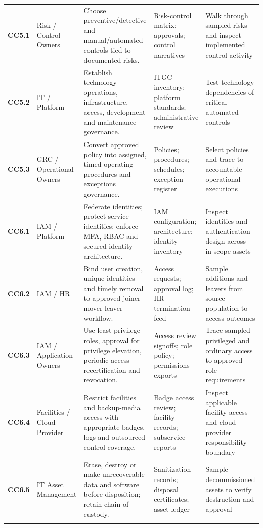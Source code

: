 \documentclass[10pt,oneside]{report}
\begin{document}
\begin{landscape}
\begin{longtable}{@{}>{\raggedright\arraybackslash}p{0.6in}>{\raggedright\arraybackslash}p{1.0in}>{\raggedright\arraybackslash}p{2.5in}>{\raggedright\arraybackslash}p{2.35in}>{\raggedright\arraybackslash}p{2.20in}@{}}
\textbf{CC5.1} & Risk / Control Owners & Choose preventive/detective and manual/automated controls tied to documented risks. & Risk-control matrix; approvals; control narratives & Walk through sampled risks and inspect implemented control activity \\
\addlinespace[5pt]
\textbf{CC5.2} & IT / Platform & Establish technology operations, infrastructure, access, development and maintenance governance. & ITGC inventory; platform standards; administrative review & Test technology dependencies of critical automated controls \\
\addlinespace[5pt]
\textbf{CC5.3} & GRC / Operational Owners & Convert approved policy into assigned, timed operating procedures and exceptions governance. & Policies; procedures; schedules; exception register & Select policies and trace to accountable operational executions \\
\addlinespace[5pt]
\textbf{CC6.1} & IAM / Platform & Federate identities; protect service identities; enforce MFA, RBAC and secured identity architecture. & IAM configuration; architecture; identity inventory & Inspect identities and authentication design across in-scope assets \\
\addlinespace[5pt]
\textbf{CC6.2} & IAM / HR & Bind user creation, unique identities and timely removal to approved joiner-mover-leaver workflow. & Access requests; approval log; HR termination feed & Sample additions and leavers from source population to access outcomes \\
\addlinespace[5pt]
\textbf{CC6.3} & IAM / Application Owners & Use least-privilege roles, approval for privilege elevation, periodic access recertification and revocation. & Access review signoffs; role policy; permissions exports & Trace sampled privileged and ordinary access to approved role requirements \\
\addlinespace[5pt]
\textbf{CC6.4} & Facilities / Cloud Provider & Restrict facilities and backup-media access with appropriate badges, logs and outsourced control coverage. & Badge access review; facility records; subservice reports & Inspect applicable facility access and cloud provider responsibility boundary \\
\addlinespace[5pt]
\textbf{CC6.5} & IT Asset Management & Erase, destroy or make unrecoverable data and software before disposition; retain chain of custody. & Sanitization records; disposal certificates; asset ledger & Sample decommissioned assets to verify destruction and approval \\
\addlinespace[5pt]

\end{longtable}
\end{landscape}
\end{document}
